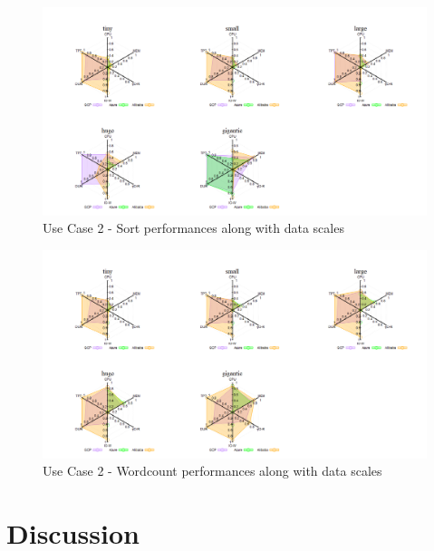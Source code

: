 \documentclass[review]{elsarticle}
\begin{document}
\begin{figure}[p]
	\caption{Use Case 2 - Sort performances along with data scales}
	\label{fig:uc2-srt-new}
	\includegraphics[width=\textwidth]{uc2-srt-new}
	\centering
\end{figure}

\begin{figure}[p]
	\caption{Use Case 2 - Wordcount performances along with data scales}
	\label{fig:uc2-wrdcnt-new}
	\includegraphics[width=\textwidth]{uc2-wrdcnt-new}
	\centering
\end{figure}



\section{Discussion}
\end{document}
